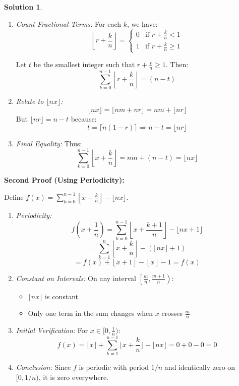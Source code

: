 \documentclass{article}
\theoremstyle{definition}
\newtheorem*{solution}{Solution}
\begin{document}
\begin{solution}
\begin{enumerate}
\item \textit{Count Fractional Terms:}
For each \( k \), we have:
\[ \left\lfloor r + \frac{k}{n} \right\rfloor = \begin{cases} 
0 & \text{if } r + \frac{k}{n} < 1 \\
1 & \text{if } r + \frac{k}{n} \geq 1 
\end{cases} \]

Let \( t \) be the smallest integer such that \( r + \frac{t}{n} \geq 1 \). Then:
\[ \sum_{k=0}^{n-1} \left\lfloor r + \frac{k}{n} \right\rfloor = (n - t) \]

\item \textit{Relate to \( \lfloor nx \rfloor \):}
\[ \lfloor nx \rfloor = \lfloor nm + nr \rfloor = nm + \lfloor nr \rfloor \]
But \( \lfloor nr \rfloor = n - t \) because:
\[ t = \lceil n(1 - r) \rceil \Rightarrow n - t = \lfloor nr \rfloor \]

\item \textit{Final Equality:}
Thus:
\[ \sum_{k=0}^{n-1} \left\lfloor x + \frac{k}{n} \right\rfloor = nm + (n - t) = \lfloor nx \rfloor \]
\end{enumerate}

\textbf{Second Proof (Using Periodicity):}

Define \( f(x) = \sum_{k=0}^{n-1} \left\lfloor x + \frac{k}{n} \right\rfloor - \lfloor nx \rfloor \).

\begin{enumerate}
\item \textit{Periodicity:}
\[ f\left(x + \frac{1}{n}\right) = \sum_{k=0}^{n-1} \left\lfloor x + \frac{k+1}{n} \right\rfloor - \lfloor nx + 1 \rfloor \]
\[ = \sum_{k=1}^{n} \left\lfloor x + \frac{k}{n} \right\rfloor - (\lfloor nx \rfloor + 1) \]
\[ = f(x) + \left\lfloor x + 1 \right\rfloor - \left\lfloor x \right\rfloor - 1 = f(x) \]

\item \textit{Constant on Intervals:}
On any interval \( \left[\frac{m}{n}, \frac{m+1}{n}\right) \):
\begin{itemize}
\item \( \lfloor nx \rfloor \) is constant
\item Only one term in the sum changes when \( x \) crosses \( \frac{m}{n} \)
\end{itemize}

\item \textit{Initial Verification:}
For \( x \in [0, \frac{1}{n}) \):
\[ f(x) = \lfloor x \rfloor + \sum_{k=1}^{n-1} \lfloor x + \frac{k}{n} \rfloor - \lfloor nx \rfloor = 0 + 0 - 0 = 0 \]

\item \textit{Conclusion:}
Since \( f \) is periodic with period \( 1/n \) and identically zero on \( [0,1/n) \), it is zero everywhere.
\end{enumerate}
\end{solution}
\end{document}
